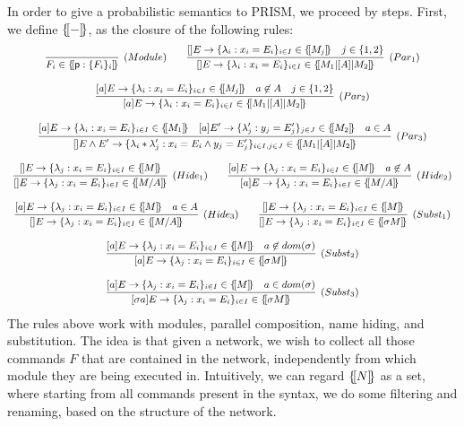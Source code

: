 In order to give a probabilistic semantics to
PRISM, we proceed by steps. First, we define $\{\![-]\!\}$, as the closure
of the following rules:
% 
\begin{displaymath}\small
  \begin{array}{ccc}
    \infer[\mathsf{(Module)}]
    {F_i\in\sem{\role{p}:\{F_i\}_i}}
    {}
    \qquad
    \infer[\mathsf{(Par_1)}]
    {\cmd{}E{\lambda_i}{x_i}{E_i}{i\in I}\in \sem{M_1\ppp A M_2}}
    {\cmd{}E{\lambda_i}{x_i}{E_i}{i\in I}\in \sem{M_j}
    & j\in\{1,2\}}
    \\\\
    \infer[\mathsf{(Par_2)}]
    {\cmd aE{\lambda_i}{x_i}{E_i}{i\in I}\in \sem{M_1\ppp A M_2}}
    {\cmd aE{\lambda_i}{x_i}{E_i}{i\in I}\in \sem{M_j}
    & a\not\in A    & j\in\{1,2\}}
    \\\\
    \infer[\mathsf{(Par_3)}]
    {
    [] E\land E' \rightarrow \{\lambda_i * \lambda_j': x_i = E_i \land y_j = E_j' \}_{i\in I, j\in J}
    \in \sem{M_1\ppp A M_2}
    }
    {\cmd aE{\lambda_i}{x_i}{E_i}{i\in I}\in \sem{M_1}{}
    & \cmd a{E'}{\lambda_j'}{y_j}{E_j'}{j\in J}\in \sem{M_2}{}
    & a\in A}
    \\\\
    \infer[\mathsf{(Hide_1)}]
    {
    \cmd {}E{\lambda_j}{x_i}{E_i}{i\in I}\in \sem{M/A}{}
    }
    {
    \cmd {}E{\lambda_j}{x_i}{E_i}{i\in I}\in \sem{M}{}
    }
    \qquad
    \infer[\mathsf{(Hide_2)}]
    {
    \cmd {a}E{\lambda_j}{x_i}{E_i}{i\in I}\in \sem{M/A}{}
    }
    {
    \cmd {a}E{\lambda_j}{x_i}{E_i}{i\in I}\in \sem{M}{}
    & a\not\in A
      }
    \\\\
    \infer[\mathsf{(Hide_3)}]
    {
    \cmd {}E{\lambda_j}{x_i}{E_i}{i\in I}\in \sem{M/A}{}
    }
    {
    \cmd {a}E{\lambda_j}{x_i}{E_i}{i\in I}\in \sem{M}{}
    & a\in A
      }
      \qquad
      \infer[\mathsf{(Subst_1)}]
      {
      \cmd {}E{\lambda_j}{x_i}{E_i}{i\in I}\in \sem{\sigma M}{}
      }
      {
      \cmd {}E{\lambda_j}{x_i}{E_i}{i\in I}\in \sem{M}{}
      }
    \\\\
    \infer[\mathsf{(Subst_2)}]
    {
    \cmd {a}E{\lambda_j}{x_i}{E_i}{i\in I}\in \sem{\sigma M}{}
    }
    {
    \cmd {a}E{\lambda_j}{x_i}{E_i}{i\in I}\in \sem{M}{}
    & a\not\in\mathsf{dom}(\sigma)
      }
    \\\\
    \infer[\mathsf{(Subst_3)}]
    {
    \cmd {\sigma a}E{\lambda_j}{x_i}{E_i}{i\in I}\in \sem{\sigma M}{}
    }
    {
    \cmd {a}E{\lambda_j}{x_i}{E_i}{i\in I}\in \sem{M}{}
    & a\in\mathsf{dom}(\sigma)
      }
  \end{array}
\end{displaymath}
The rules above work with modules, parallel composition, name hiding,
and substitution. The idea is that given a network, we wish to collect
all those commands $F$ that are contained in the network,
independently from which module they are being executed
in. Intuitively, we can regard $\{\![N]\!\}$ as a set, where starting from
all commands present in the syntax, we do some filtering and renaming,
based on the structure of the network.

